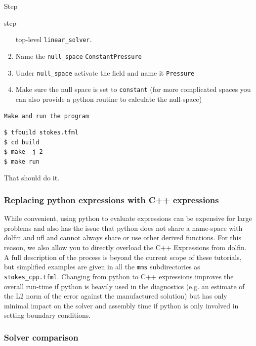 \begin{steps}{Step}
\begin{steps}{step}
\begin{enumerate}
      top-level \texttt{linear\_solver}.
    \item Name the \texttt{null\_space} \texttt{ConstantPressure}
    \item Under \texttt{null\_space} activate the field and name it \texttt{Pressure}
    \item Make sure the null space is set to \texttt{constant} (for
      more complicated spaces you can also provide a python routine to
      calculate the null-space)
    \end{enumerate}
  \end{steps}
\item \texttt{Make and run the program}
  \begin{lstlisting}[style=bash]
$ tfbuild stokes.tfml
$ cd build
$ make -j 2 
$ make run
\end{lstlisting}


\end{steps}

That should do it.  

\subsubsection{Replacing python expressions with C++ expressions}

While convenient,  using python to evaluate expressions can be
expensive for large problems and also has the issue that python does
not share a name-space with dolfin and ufl and cannot always share or
use other derived functions.  For this reason, we also allow you to
directly overload the C++ Expressions from dolfin.  A full description
of the process is beyond the current scope of these tutorials, but 
simplified examples are given in all the \texttt{mms} subdirectories
as \texttt{stokes\_cpp.tfml}. Changing from python to C++ expressions
improves the overall run-time if python is heavily used in the
diagnostics (e.g. an estimate of the L2 norm of the error against the
manufactured solution) but has only minimal impact on the solver and
assembly time if python is only involved in setting boundary
conditions.

\subsubsection{Solver comparison}
\label{sec:solver-comparison}

